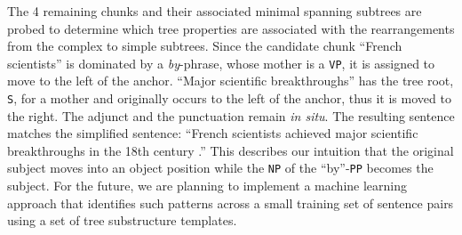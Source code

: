 \documentclass[a4paper,11pt]{article}
\begin{document}
The 4 remaining chunks and their associated minimal spanning subtrees are probed to determine which tree properties are associated with the rearrangements from the complex to simple subtrees.  Since the candidate chunk ``French scientists'' is dominated by a \textit{by}-phrase, whose mother is a \texttt{VP}, it  is assigned to move to the left of the anchor. ``Major scientific breakthroughs'' has the tree root, \texttt{S}, for a mother and originally occurs to the left of the anchor, thus it is moved to the right.  The adjunct and the punctuation remain \textit{in situ}. The resulting sentence matches the simplified sentence: ``French scientists achieved major scientific breakthroughs in the 18th century .'' This describes our intuition that the original subject moves into an object position while the \texttt{NP} of the ``by''-\texttt{PP} becomes the subject. For the future, we are planning to implement a machine learning approach that identifies such patterns across a small training set of sentence pairs using a set of tree substructure templates.  %

\end{document}
